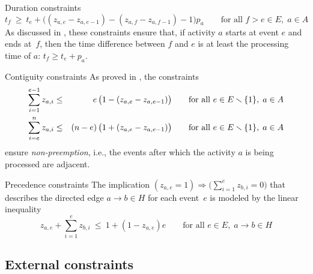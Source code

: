 \documentclass[11pt,reqno]{amsart}
\newcommand{\lra}{\longrightarrow}
\numberwithin{equation}{section}
\begin{document}
\begin{mydesc}
\item[Duration constraints]
  \begin{equation}
     t_f 
     \ \ge \
     t_e + \big((z_{a,e} - z_{a,e-1} ) - (z_{a,f} - z_{a,f-1}) - 1\big) p_a
     \qquad\text{for all } f>e\in E,\; a\in A
  \end{equation}
  As discussed in \cite{artigues-etal11}, these constraints ensure that,
if activity $a$ starts at event $e$ and ends at~$f$, then the time difference between  $f$
and $e$ is at least the processing time of $a$: $t_f \ge t_e + p_a$.

\item[Contiguity constraints] As proved in \cite[Proposition 1]{artigues-etal11a}, the
  constraints
  \begin{eqnarray}
    \sum_{i=1}^{e-1} z_{a,i}
    &\le&
    \phantom{(n-e)}\llap{$e$}\,\big(1-(z_{a,e} - z_{a,e-1})\big)
    \qquad\text{for all } e\in E\smallsetminus\{1\},\; a\in A
    \\
    \sum_{i=e}^n z_{a,i}
    &\le&
    (n-e)\,\big(1+(z_{a,e} - z_{a,e-1})\big)
    \qquad\text{for all } e\in E\smallsetminus\{1\},\; a\in A
  \end{eqnarray}
  ensure \emph{non-preemption}, i.e., the events after which the activity $a$ is being
  processed are adjacent.

\item[Precedence constraints] The implication $(z_{a,e}=1) \Longrightarrow
  \big(\sum_{i=1}^{e} z_{b,i}=0\big)$ that describes the directed edge $a\lra b\in H$ for
  each event~$e$ is modeled by the linear inequality
  \begin{equation}
     z_{a,e} + \sum_{i=1}^e z_{b,i}
     \ \le \
     1+(1-z_{a,e})e
     \qquad\text{for all } e\in E,\; a\lra b\in H
  \end{equation}

\end{mydesc}

\subsection{External constraints}
\end{document}
